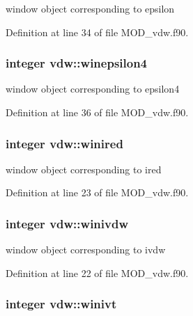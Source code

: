 window object corresponding to epsilon 



Definition at line 34 of file M\-O\-D\-\_\-vdw.\-f90.

\hypertarget{classvdw_aa83424a9fd661a24af2a7f3398752043}{
\subsubsection[{winepsilon4}]{\setlength{\rightskip}{0pt plus 5cm}integer vdw\-::winepsilon4}}\label{classvdw_aa83424a9fd661a24af2a7f3398752043}


window object corresponding to epsilon4 



Definition at line 36 of file M\-O\-D\-\_\-vdw.\-f90.

\hypertarget{classvdw_aab00860bd4307394370977abffd67b50}{
\subsubsection[{winired}]{\setlength{\rightskip}{0pt plus 5cm}integer vdw\-::winired}}\label{classvdw_aab00860bd4307394370977abffd67b50}


window object corresponding to ired 



Definition at line 23 of file M\-O\-D\-\_\-vdw.\-f90.

\hypertarget{classvdw_ab3382a5da536eaf9c75c72b23234c438}{
\subsubsection[{winivdw}]{\setlength{\rightskip}{0pt plus 5cm}integer vdw\-::winivdw}}\label{classvdw_ab3382a5da536eaf9c75c72b23234c438}


window object corresponding to ivdw 



Definition at line 22 of file M\-O\-D\-\_\-vdw.\-f90.

\hypertarget{classvdw_a56c4d404eab08a1617766f8fde8b75cb}{
\subsubsection[{winivt}]{\setlength{\rightskip}{0pt plus 5cm}integer vdw\-::winivt}}\label{classvdw_a56c4d404eab08a1617766f8fde8b75cb}


